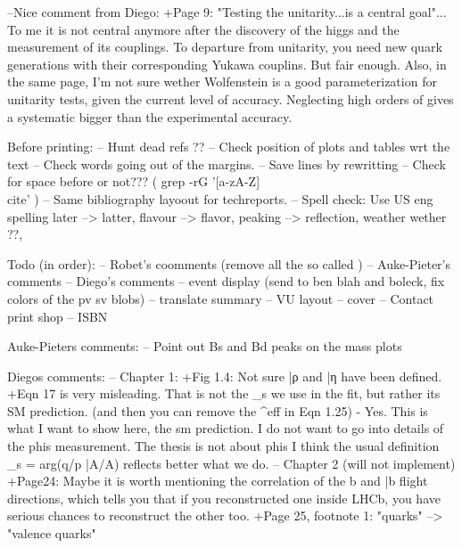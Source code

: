 --Nice comment from Diego: +Page 9: "Testing the unitarity...is a central goal"... To me it is not central anymore after the discovery
of the higgs and the measurement of its couplings. To departure from unitarity, you need new quark
generations with their corresponding Yukawa couplins. But fair enough.
 Also, in the same page, I'm not sure wether Wolfenstein is a good parameterization for unitarity tests,
given the current level of accuracy. Neglecting high orders of \lambda gives a systematic bigger than
the experimental accuracy.


Before printing:
-- Hunt dead refs ??
-- Check position of plots and tables wrt the text
-- Check words going out of the margins.
-- Save lines by rewritting
-- Check for space before \cite{} or not??? ( grep -rG  '[a-zA-Z]\\cite' )
-- Same bibliography layoout for techreports.
-- Spell check:  Use US eng spelling  later --> latter, flavour --> flavor, peaking --> reflection, weather wether ??,

Todo (in order):
-- Robet's coomments (remove all the so called )
-- Auke-Pieter's comments
-- Diego's comments
-- event display (send to ben blah and boleck, fix colors of the pv sv blobs)
-- translate summary
-- VU layout
-- cover
-- Contact print shop
-- ISBN

Auke-Pieters comments:
-- Point out Bs and Bd peaks on the mass plots

Diegos comments:
-- Chapter 1:
  +Fig 1.4: Not sure \bar{ρ} and \bar{η} have been defined.
  +Eqn 17 is very misleading. That is not the \phi_s we use in the fit, but rather its
          SM prediction. (and then you can remove the ^{eff} in Eqn 1.25)
  - Yes. This is what I want to show here, the sm prediction. I do not want to go into
          details of the phis measurement. The thesis is not about phis I think the usual definition \phi_s = arg(q/p \bar{A}/{A}) reflects better what we do.
-- Chapter 2 (will not implement)
  +Page24: Maybe it is worth mentioning the correlation of the b and \bar{b} flight directions,
           which tells you that if you reconstructed one inside LHCb, you have serious chances to reconstruct the other too.
  +Page 25, footnote 1: "quarks" --> "valence quarks"

